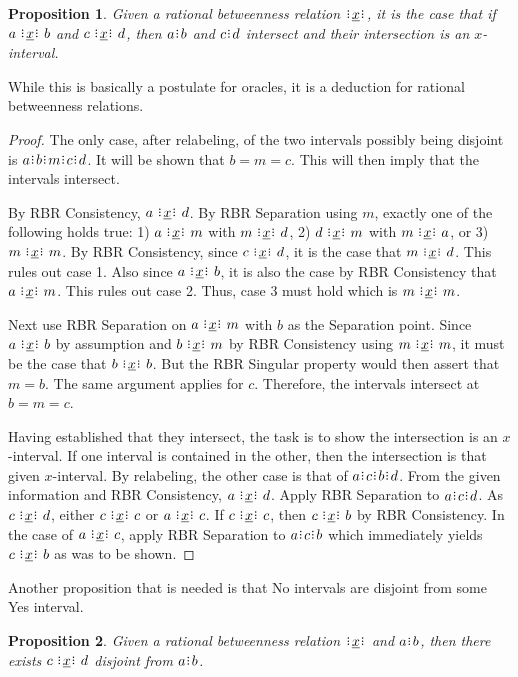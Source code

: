 \documentclass[12pt]{article}
\newtheorem{proposition}{Proposition}[section]
\begin{document}
\begin{proposition}
    Given a rational betweenness relation $\xrel$, it is the case that if $a \xrel b$ and $c \xrel d$, then $a\rint b$ and $c\rint d$ intersect and their intersection is an $x$-interval.
\end{proposition}

While this is basically a postulate for oracles, it is a deduction for rational betweenness relations. 

\begin{proof}
    The only case, after relabeling, of the two intervals possibly being disjoint is $a\rint b\rint m\rint c\rint d$. It will be shown that $b = m = c$. This will then imply that the intervals intersect. 
    
    By RBR Consistency, $a \xrel d$. By RBR Separation using $m$, exactly one of the following holds true:  1) $a \xrel m$ with \sout{$m \xrel d$}, 2) $d \xrel m$ with \sout{$m \xrel a$}, or 3) $m \xrel m$. By RBR Consistency, since $c \xrel d$, it is the case that $m \xrel d$. This rules out case 1. Also since $a \xrel b$, it is also the case by RBR Consistency that $a \xrel m$. This rules out case 2. Thus, case 3 must hold which is $m \xrel m$. 
    
    Next use RBR Separation on $a \xrel m$ with $b$ as the Separation point. Since $a \xrel b$ by assumption and $b \xrel m$ by RBR Consistency using $m \xrel m$, it must be the case that $b \xrel b$. But the RBR Singular property would then assert that $m = b$. The same argument applies for $c$. Therefore, the intervals intersect at $b = m = c$. 

    Having established that they intersect, the task is to show the intersection is an $x$-interval. If one interval is contained in the other, then the intersection is that given $x$-interval. By relabeling, the other case is that of $a\rint c\rint b\rint d$. From the given information and RBR Consistency, $a \xrel d$. Apply RBR Separation to $a\rint c\rint d$. As $c \xrel d$, either $c \xrel c$ or \sout{$a \xrel c$}. If $c \xrel c$, then $c \xrel b$ by RBR Consistency. In the case of \sout{$a \xrel c$}, apply RBR Separation to $a\rint c\rint b$ which immediately yields $c \xrel b$ as was to be shown. 
    
\end{proof}


Another proposition that is needed is that No intervals are disjoint from some Yes interval. 

\begin{proposition}
    Given  a rational betweenness relation $\xrel$ and \sout{$a\rint b$}, then there exists $c \xrel d$ disjoint from $a\rint b$.
\end{proposition}
\end{document}
